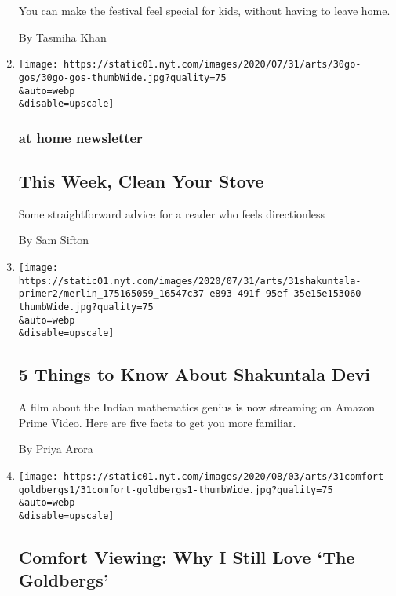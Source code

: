 \begin{enumerate}
  You can make the festival feel special for kids, without having to
  leave home.

  By Tasmiha Khan
\item
  \href{/2020/07/31/at-home/newsletter.html}{}

  \texttt{[image: https://static01.nyt.com/images/2020/07/31/arts/30go-gos/30go-gos-thumbWide.jpg?quality=75\\\&auto=webp\\\&disable=upscale]}

  \hypertarget{at-home-newsletter-1}{%
  \subsubsection{at home newsletter}\label{at-home-newsletter-1}}

  \hypertarget{this-week-clean-your-stove-1}{%
  \subsection{This Week, Clean Your
  Stove}\label{this-week-clean-your-stove-1}}

  Some straightforward advice for a reader who feels directionless

  By Sam Sifton
\item
  \href{/2020/07/31/movies/shakuntala-devi-movie.html}{}

  \texttt{[image: https://static01.nyt.com/images/2020/07/31/arts/31shakuntala-primer2/merlin\_175165059\_16547c37-e893-491f-95ef-35e15e153060-thumbWide.jpg?quality=75\\\&auto=webp\\\&disable=upscale]}

  \hypertarget{5-things-to-know-about-shakuntala-devi}{%
  \subsection{5 Things to Know About Shakuntala
  Devi}\label{5-things-to-know-about-shakuntala-devi}}

  A film about the Indian mathematics genius is now streaming on Amazon
  Prime Video. Here are five facts to get you more familiar.

  By Priya Arora
\item
  \href{/2020/07/31/arts/television/goldbergs-abc-stream.html}{}

  \texttt{[image: https://static01.nyt.com/images/2020/08/03/arts/31comfort-goldbergs1/31comfort-goldbergs1-thumbWide.jpg?quality=75\\\&auto=webp\\\&disable=upscale]}

  \hypertarget{comfort-viewing-why-i-still-love-the-goldbergs-1}{%
  \subsection{Comfort Viewing: Why I Still Love `The
  Goldbergs'}\label{comfort-viewing-why-i-still-love-the-goldbergs-1}}


\end{enumerate}
